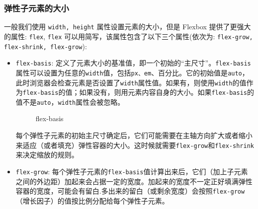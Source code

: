\subsubsection*{弹性子元素的大小}

一般我们使用 \texttt{width, height} 属性设置元素的大小，但是 Flexbox 提供了更强大的属性: \texttt{flex}, \texttt{flex} 可以用简写，该属性包含了以下三个属性(依次为: \texttt{flex-grow, flex-shrink, flex-grow}):
\begin{itemize}
    \item \texttt{flex-basis}: 定义了元素大小的基准值，即一个初始的“主尺寸”。\texttt{flex-basis}属性可以设置为任意的\texttt{width}值，包括\texttt{px、em}、百分比。它的初始值是\texttt{auto}，此时浏览器会检查元素是否设置了\texttt{width}属性值。如果有，则使用\texttt{width}的值作为\texttt{flex-basis}的值；如果没有，则用元素内容自身的大小。如果\texttt{flex-basis}的值不是\texttt{auto}，\texttt{width}属性会被忽略。
\begin{figure}[H]
    \small
    \centering
    \caption{flex-basis}
    \label{fig:flex-basis}
\end{figure}
每个弹性子元素的初始主尺寸确定后，它们可能需要在主轴方向扩大或者缩小来适应（或者填充）弹性容器的大小。这时候就需要\texttt{flex-grow}和\texttt{flex-shrink}来决定缩放的规则。
    \item \texttt{flex-grow}: 每个弹性子元素的\texttt{flex-basis}值计算出来后，它们（加上子元素之间的外边距）加起来会占据一定的宽度。加起来的宽度不一定正好填满弹性容器的宽度，可能会有留白.多出来的留白（或剩余宽度）会按照\texttt{flex-grow}（增长因子）的值按比例分配给每个弹性子元素。
\begin{figure}[H]
    \small

\end{figure}
\end{itemize}
